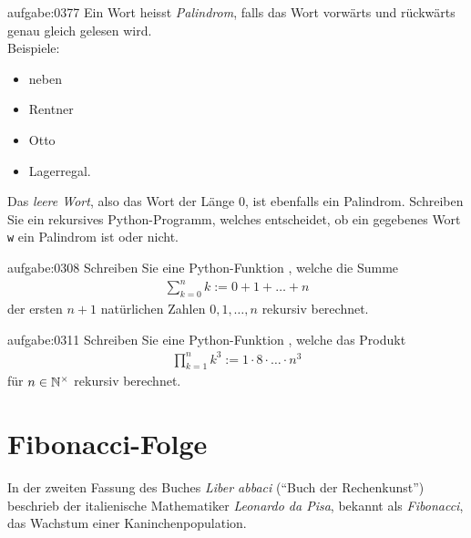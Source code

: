 \begin{aufgabe}{aufgabe:0377}
Ein Wort heisst \textit{Palindrom}, falls das Wort vorwärts und rückwärts genau gleich gelesen wird.\\
Beispiele:
\begin{itemize}
    \item neben
    \item Rentner
    \item Otto
    \item Lagerregal.
\end{itemize}
Das \textit{leere Wort}, also das Wort der Länge $0$, ist ebenfalls ein Palindrom. Schreiben Sie ein rekursives Python-Programm, welches entscheidet, ob ein gegebenes Wort \verb|w| ein Palindrom ist oder nicht.
\end{aufgabe}

\begin{aufgabe}{aufgabe:0308}
Schreiben Sie eine Python-Funktion , welche die Summe
\begin{align*}
    \sum_{k=0}^n k := 0 + 1 + \ldots + n
\end{align*}
der ersten $n+1$ natürlichen Zahlen $0,1,\ldots ,n$ rekursiv berechnet.
\end{aufgabe}

\begin{aufgabe}{aufgabe:0311}
Schreiben Sie eine Python-Funktion , welche das Produkt
\begin{align*}
    \prod_{k=1}^n k^3 := 1 \cdot 8 \cdot \ldots \cdot n^3
\end{align*}
für $n\in\mathbb{N}^{\times}$ rekursiv berechnet.
\end{aufgabe}

\clearpage

\section{Fibonacci-Folge}
In der zweiten Fassung des Buches \textit{Liber abbaci} (\enquote{Buch der Rechenkunst}) beschrieb der italienische Mathematiker \textit{Leonardo da Pisa}, bekannt als \textit{Fibonacci}, das Wachstum einer Kaninchenpopulation.


